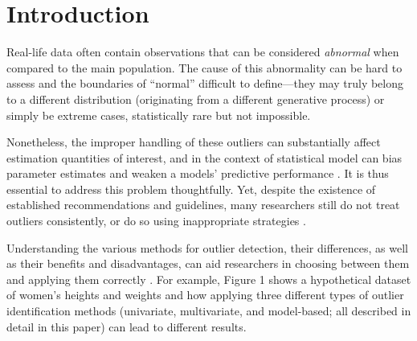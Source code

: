 \documentclass[sn-basic, lineno,pdflatex]{sn-jnl}
\begin{document}



\maketitle

\section{Introduction}\label{introduction}

Real-life data often contain observations that can be considered
\emph{abnormal} when compared to the main population. The cause of this
abnormality can be hard to assess and the boundaries of ``normal''
difficult to define---they may truly belong to a different distribution
(originating from a different generative process) or simply be extreme
cases, statistically rare but not impossible.

Nonetheless, the improper handling of these outliers can substantially
affect estimation quantities of interest, and in the context of
statistical model can bias parameter estimates and weaken a models'
predictive performance \citep{aguinis2013best}. It is thus essential to
address this problem thoughtfully. Yet, despite the existence of
established recommendations and guidelines, many researchers still do
not treat outliers consistently, or do so using inappropriate strategies
\citep{aguinis2013best, simmons2011false, leys2013outliers}.

Understanding the various methods for outlier detection, their
differences, as well as their benefits and disadvantages, can aid
researchers in choosing between them and applying them correctly
\citep[see][for an overview of pros and cons of several recently
developed advanced methods]{smiti2020critical}. For example, Figure 1
shows a hypothetical dataset of women's heights and weights \citep[based
on the ``women'' dataset in R,][]{mcneil1977interactive} and how
applying three different types of outlier identification methods
(univariate, multivariate, and model-based; all described in detail in
this paper) can lead to different results.
\end{document}
